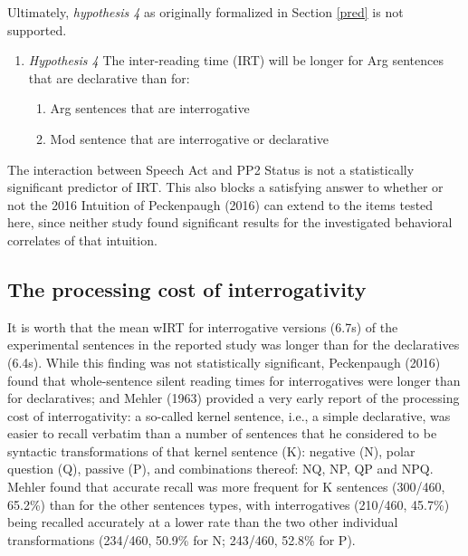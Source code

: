 \documentclass[12pt,oneside]{book}
\providecommand{\tightlist}{%
  \setlength{\itemsep}{0pt}\setlength{\parskip}{0pt}}
\begin{document}
Ultimately, \emph{hypothesis 4} as originally formalized in Section \ref{pred} is not supported.

\begin{enumerate}
\def\labelenumi{(\arabic{enumi})}
\setcounter{enumi}{59}
\tightlist
\item
  \emph{Hypothesis 4}
  The inter-reading time (IRT) will be longer for Arg sentences that are declarative than for:

  \begin{enumerate}
  \def\labelenumii{\alph{enumii}.}
  \tightlist
  \item
    Arg sentences that are interrogative
  \item
    Mod sentence that are interrogative or declarative
  \end{enumerate}
\end{enumerate}

The interaction between Speech Act and PP2 Status is not a statistically significant predictor of IRT. This also blocks a satisfying answer to whether or not the 2016 Intuition of Peckenpaugh (2016) can extend to the items tested here, since neither study found significant results for the investigated behavioral correlates of that intuition.

\hypertarget{qslow}{%
\subsection{The processing cost of interrogativity}\label{qslow}}

It is worth  that the mean wIRT for interrogative versions (6.7s) of the experimental sentences in the reported study was longer than for the declaratives (6.4s). While this finding was not statistically significant, Peckenpaugh (2016) found that whole-sentence silent reading times for interrogatives were longer than for declaratives; and Mehler (1963) provided a very early report of the processing cost of interrogativity: a so-called kernel sentence, i.e., a simple declarative, was easier to recall verbatim than  a number of sentences that he considered to be syntactic transformations of that kernel sentence (K): negative (N), polar question (Q), passive (P), and combinations thereof: NQ, NP, QP and NPQ. Mehler found that accurate recall was more frequent for K sentences (300/460, 65.2\%) than for the other sentences types, with interrogatives (210/460, 45.7\%) being recalled accurately at a lower rate than the two other individual transformations (234/460, 50.9\% for N; 243/460, 52.8\% for P).
\end{document}
